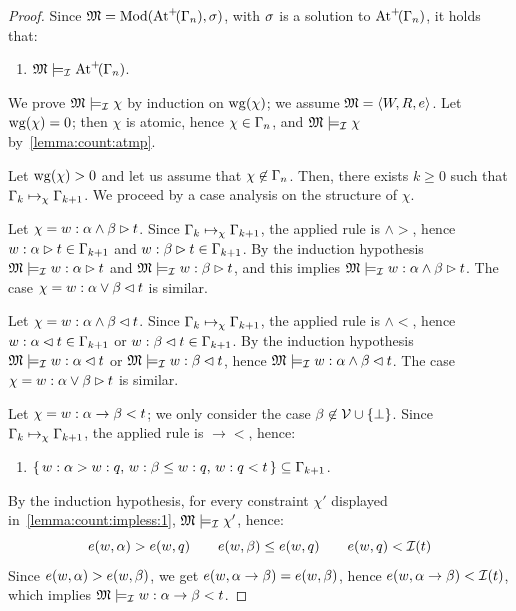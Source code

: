 \begin{proof}
  Since $\mathfrak{M}=\mathrm{Mod}(\mathrm{At}^{+}\!(\Gamma_n),\sigma)$, with $\sigma$ is a solution to $\mathrm{At}^{+}\!(\Gamma_n)$,
  it holds that:
  \begin{enumerate}[label=(\arabic*), ref=(\arabic*),leftmargin=*]
  \item\label{lemma:count:atmp}
    $\mathfrak{M}\models_{\mathcal{I}} \mathrm{At}^{+}\!(\Gamma_n)$.
  \end{enumerate}
  We prove  $\mathfrak{M}\models_{\mathcal{I}} \chi$ by induction on $\mathrm{wg}(\chi)$;
  we assume $\mathfrak{M}=\langle W,R,e \rangle$.
  Let $\mathrm{wg}(\chi)=0$; then $\chi$ is atomic, hence $\chi\in\Gamma_n$,
  and $\mathfrak{M}\models_{\mathcal{I}} \chi$ by~\ref{lemma:count:atmp}.
  
  Let $\mathrm{wg}(\chi)>0$ and let us assume that  $\chi\not\in \Gamma_n$.
  Then, there exists $k \geq  0$ such that
  $\Gamma_k\mapsto_\chi \Gamma_{k+1}$. 
  We proceed by a case analysis on the structure of $\chi$.
  
  
  Let $\chi= w:\alpha\land \beta\rhd t$.  Since $\Gamma_k\mapsto_\chi \Gamma_{k+1}$,
  the applied rule is $\land\gt$, hence $w:\alpha\rhd t\in \Gamma_{k+1}$ and
  $w:\beta \rhd t\in \Gamma_{k+1}$.  By the induction hypothesis
  $\mathfrak{M}\models_{\mathcal{I}} w:\alpha\rhd t$ and $\mathfrak{M}\models_{\mathcal{I}} w:\beta \rhd t $, and
  this implies $\mathfrak{M}\models_{\mathcal{I}} w:\alpha\land \beta\rhd t$.  The case $\chi=
  w:\alpha\lor \beta\lhd t$ is similar.

  Let $\chi= w:\alpha\land \beta\lhd t$.  Since $\Gamma_k\mapsto_\chi \Gamma_{k+1}$,
  the applied rule is $\land\lt$, hence $w:\alpha\lhd t \in \Gamma_{k+1}$ or
  $w:\beta\lhd t \in \Gamma_{k+1}$.  By the induction hypothesis
  $\mathfrak{M}\models_{\mathcal{I}} w:\alpha\lhd t $ or $\mathfrak{M}\models_{\mathcal{I}} w:\beta\lhd t $, hence
  $\mathfrak{M}\models_{\mathcal{I}} w:\alpha\land \beta\lhd t$.  The case $\chi= w:\alpha\lor \beta\rhd
  t$ is similar.
 
 
  Let $\chi= w:\alpha\to \beta < t$; we only consider the case
  $\beta\not\in\mathcal{V}\cup\{\bot\}$.  Since $\Gamma_k\mapsto_\chi \Gamma_{k+1}$, the
  applied rule is $\to<$, hence:
 \begin{enumerate}[label=(\Alph*), ref=(\Alph*),leftmargin=*]
 \item\label{lemma:count:impless:1}
   $\{\,w:\alpha > w : q,\, w:\beta \leq w : q,\,w: q < t\,\} \subseteq \Gamma_{k+1}$. 
 \end{enumerate}
 By the induction hypothesis,
 for every constraint $\chi'$  displayed in~\ref{lemma:count:impless:1},
 $\mathfrak{M}\models_{\mathcal{I}} \chi'$, hence:
 \[
 e(w,\alpha) > e(w,q) \qquad e(w,\beta) \leq e(w,q) \qquad e(w,q) < \mathcal{I}(t)
 \]  
 Since $e(w,\alpha) > e(w,\beta)$, we get  $e(w,\alpha\to \beta) = e(w,\beta)$, hence  $e(w,\alpha\to \beta) < \mathcal{I}(t)$,
 which implies $\mathfrak{M}\models_{\mathcal{I}}  w:\alpha\to \beta < t  $.
 

\end{proof}
